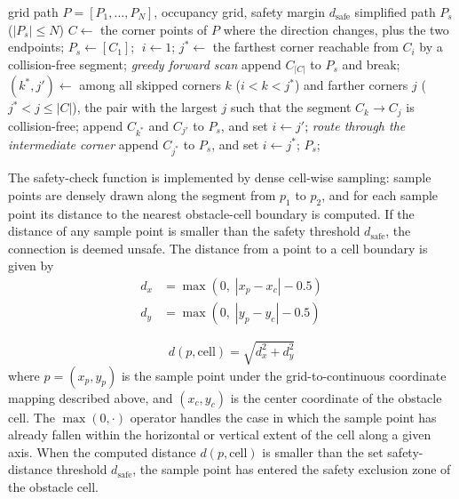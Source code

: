 \documentclass[pdflatex,sn-basic,Numbered]{sn-jnl}
\begin{document}
\begin{algorithm}[!t]
\caption{Safety-distance-aware path simplification}
\label{alg:simplify}

\begin{algorithmic}[1]
\Require grid path $P = [P_1, \ldots, P_N]$, occupancy grid, safety margin $d_{\mathrm{safe}}$
\Ensure simplified path $P_s$ ($|P_s| \leq N$)
\State $C \gets$ the corner points of $P$ where the direction changes, plus the two endpoints;
\State $P_s \gets [C_1]$; $\; i \gets 1$;
\State $j^{*} \gets$ the farthest corner reachable from $C_i$ by a collision-free segment; \quad\textit{greedy forward scan}
\State append $C_{|C|}$ to $P_s$ and break;
\EndIf
\State $(k^{*}, j') \gets$ among all skipped corners $k$ ($i < k < j^{*}$) and farther corners $j$ ($j^{*} < j \leq |C|$), the pair with the largest $j$ such that the segment $C_k \to C_j$ is collision-free;
\State append $C_{k^{*}}$ and $C_{j'}$ to $P_s$, and set $i \gets j'$; \quad\textit{route through the intermediate corner}
\Else
\State append $C_{j^{*}}$ to $P_s$, and set $i \gets j^{*}$;
\EndIf
\EndWhile
\State\Return $P_s$;
\end{algorithmic}

\end{algorithm}

The safety-check function is implemented by dense cell-wise sampling: sample points are densely drawn along the segment from $p_1$ to $p_2$, and for each sample point its distance to the nearest obstacle-cell boundary is computed. If the distance of any sample point is smaller than the safety threshold $d_{\mathrm{safe}}$, the connection is deemed unsafe. The distance from a point to a cell boundary is given by
\begin{equation}
\begin{split}
d_x &= \max\left(0,\; |x_p - x_c| - 0.5\right)\\
d_y &= \max\left(0,\; |y_p - y_c| - 0.5\right)
\end{split}
\label{eq:dxymax}
\end{equation}

\begin{equation}
d(p, \mathrm{cell}) = \sqrt{d_x^2 + d_y^2}
\label{eq:dist}
\end{equation}
where $p = (x_p, y_p)$ is the sample point under the grid-to-continuous coordinate mapping described above, and $(x_c, y_c)$ is the center coordinate of the obstacle cell. The $\max(0, \cdot)$ operator handles the case in which the sample point has already fallen within the horizontal or vertical extent of the cell along a given axis. When the computed distance $d(p, \mathrm{cell})$ is smaller than the set safety-distance threshold $d_{\mathrm{safe}}$, the sample point has entered the safety exclusion zone of the obstacle cell.
\end{document}
